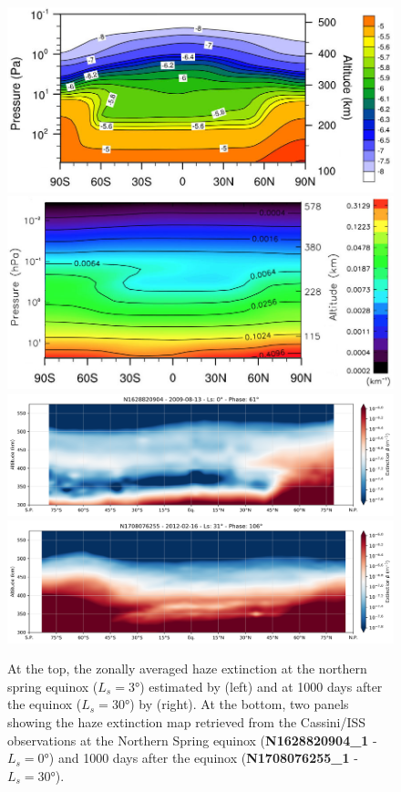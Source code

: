 \begin{figure}[!ht]
    \centering
    \includegraphics[width=.4\textwidth]{Fig/Lebonnois2012_Fig4_equinox.jpg}
    \includegraphics[width=.4\textwidth]{Fig/Larson2015-Fig7_Spring.jpg}
    \includegraphics[width=.8\textwidth]{Fig/N1628820904_1-lat_beta.png}
    \includegraphics[width=.8\textwidth]{Fig/N1708076255_1-lat_beta.png}
    \caption{At the top, the zonally averaged haze extinction at the northern spring equinox ($L_s = \ang{3}$)
        estimated by \cite{Lebonnois2012} (left) and at 1000 days after the equinox ($L_s = \ang{30}$)
        by \cite{Larson2015} (right).
        At the bottom, two panels showing the haze extinction map retrieved from the Cassini/ISS observations
        at the Northern Spring equinox (\textbf{N1628820904\_1} - $L_s = \ang{0}$) and 1000 days after the equinox
        (\textbf{N1708076255\_1} - $L_s = \ang{30}$).}
    \label{fig:gcm_spring}
\end{figure}

